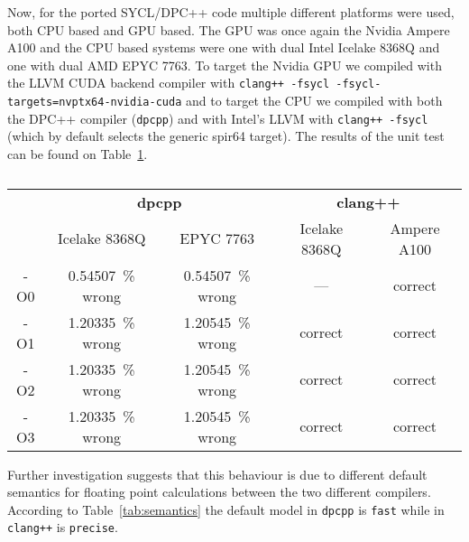 \documentclass[../main]{subfiles}
\begin{document}
Now, for the ported SYCL/DPC++ code multiple different platforms were used, both CPU based and GPU based.
The GPU was once again the Nvidia Ampere A100 and the CPU based systems were one with dual Intel Icelake 8368Q and one with dual AMD EPYC 7763.
To target the Nvidia GPU we compiled with the LLVM CUDA backend compiler with \texttt{clang++ -fsycl -fsycl-targets=nvptx64-nvidia-cuda} and to target the CPU we compiled with both the DPC++ compiler (\texttt{dpcpp}) and with Intel's LLVM with \texttt{clang++ -fsycl} (which by default selects the generic spir64 target).
The results of the unit test can be found on Table~\ref{tab:correctness}.

\begin{table}[!htbp]
	\begin{tabular}{@{}c c c c c@{}}
		\toprule
		    & \multicolumn{2}{c}{\textbf{dpcpp}} & \multicolumn{2}{c}{\textbf{clang++}}                               \\
		\cmidrule(lr){2-3}\cmidrule(lr){4-5}
		    & {Icelake 8368Q}                    & EPYC 7763                            & Icelake 8368Q & Ampere A100 \\
		\midrule
		-O0 & \qty{0.54507}{\percent} wrong      & \qty{0.54507}{\percent} wrong        & ---           & correct     \\
		-O1 & \qty{1.20335}{\percent} wrong      & \qty{1.20545}{\percent} wrong        & correct       & correct     \\
		-O2 & \qty{1.20335}{\percent} wrong      & \qty{1.20545}{\percent} wrong        & correct       & correct     \\
		-O3 & \qty{1.20335}{\percent} wrong      & \qty{1.20545}{\percent} wrong        & correct       & correct     \\
		\bottomrule
	\end{tabular}
	\caption{\label{tab:correctness}}
\end{table}

Further investigation suggests that this behaviour is due to different default semantics for floating point calculations between the two different compilers.
According to Table~\ref{tab:semantics} the default model in \texttt{dpcpp} is \texttt{fast} while in \texttt{clang++} is \texttt{precise}.
\end{document}
